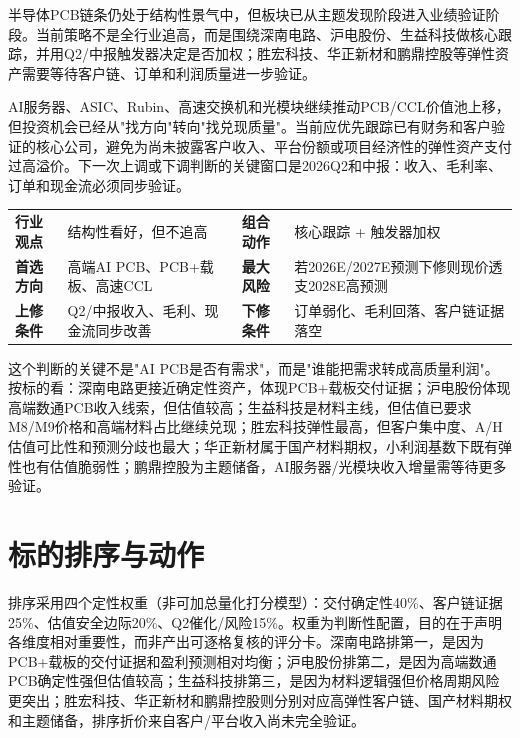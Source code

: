 半导体PCB链条仍处于结构性景气中，但板块已从主题发现阶段进入业绩验证阶段。当前策略不是全行业追高，而是围绕深南电路、沪电股份、生益科技做核心跟踪，并用Q2/中报触发器决定是否加权；胜宏科技、华正新材和鹏鼎控股等弹性资产需要等待客户链、订单和利润质量进一步验证。

\begin{houseviewbox}[本机构结论]
AI服务器、ASIC、Rubin、高速交换机和光模块继续推动PCB/CCL价值池上移，但投资机会已经从"找方向"转向"找兑现质量"。当前应优先跟踪已有财务和客户验证的核心公司，避免为尚未披露客户收入、平台份额或项目经济性的弹性资产支付过高溢价。下一次上调或下调判断的关键窗口是2026Q2和中报：收入、毛利率、订单和现金流必须同步验证。
\end{houseviewbox}

\begin{dashboardbox}[首页决策结论]
\begin{tabularx}{\textwidth}{L{2.8cm}X L{2.6cm}X}
\toprule
\textbf{行业观点} & 结构性看好，但不追高 & \textbf{组合动作} & 核心跟踪 + 触发器加权 \\
\textbf{首选方向} & 高端AI PCB、PCB+载板、高速CCL & \textbf{最大风险} & 若2026E/2027E预测下修则现价透支2028E高预测 \\
\textbf{上修条件} & Q2/中报收入、毛利、现金流同步改善 & \textbf{下修条件} & 订单弱化、毛利回落、客户链证据落空 \\
\bottomrule
\end{tabularx}
\end{dashboardbox}

这个判断的关键不是"AI PCB是否有需求"，而是"谁能把需求转成高质量利润"。按标的看：深南电路更接近确定性资产，体现PCB+载板交付证据；沪电股份体现高端数通PCB收入线索，但估值较高；生益科技是材料主线，但估值已要求M8/M9价格和高端材料占比继续兑现；胜宏科技弹性最高，但客户集中度、A/H估值可比性和预测分歧也最大；华正新材属于国产材料期权，小利润基数下既有弹性也有估值脆弱性；鹏鼎控股为主题储备，AI服务器/光模块收入增量需等待更多验证。

\section{标的排序与动作}

排序采用四个定性权重（非可加总量化打分模型）：交付确定性40\%、客户链证据25\%、估值安全边际20\%、Q2催化/风险15\%。权重为判断性配置，目的在于声明各维度相对重要性，而非产出可逐格复核的评分卡。深南电路排第一，是因为PCB+载板的交付证据和盈利预测相对均衡；沪电股份排第二，是因为高端数通PCB确定性强但估值较高；生益科技排第三，是因为材料逻辑强但价格周期风险更突出；胜宏科技、华正新材和鹏鼎控股则分别对应高弹性客户链、国产材料期权和主题储备，排序折价来自客户/平台收入尚未完全验证。

